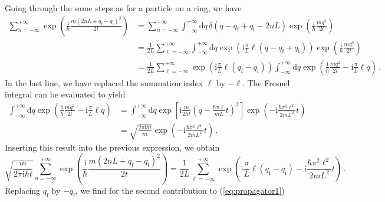 \documentclass[11pt,DIV=19,parskip=half]{scrartcl}
\begin{document}
Going through the same steps as for a particle on a ring, we have
\begin{equation}
 \begin{aligned}
  \sum_{n=-\infty}^{+\infty}\exp\!\left(\frac{\text{i}}{\hbar}
                 \frac{m(2nL+q_\text{f}-q_\text{i})^2}{2t}\right) &= 
  \sum_{n=-\infty}^{+\infty}\int_{-\infty}^{+\infty}\text{d}q\,\delta(q-q_\text{f}+q_\text{i}-2nL)
        \exp\!\left(\frac{\text{i}}{\hbar}\frac{mq^2}{2t}\right)\\
  &= \frac{1}{2L}\sum_{\ell=-\infty}^{+\infty}\int_{-\infty}^{+\infty}\text{d}q
       \exp\!\left(\text{i}\frac{\pi}{L}\ell(q-q_\text{f}+q_\text{i})\right)
       \exp\!\left(\frac{\text{i}}{\hbar}\frac{mq^2}{2t}\right)\\
  &= \frac{1}{2L}\sum_{\ell=-\infty}^{+\infty}
         \exp\!\left(\text{i}\frac{\pi}{L}\ell(q_\text{f}-q_\text{i})\right)
  \int_{-\infty}^{+\infty}\text{d}q\exp\!\left(\frac{\text{i}}{\hbar}\frac{mq^2}{2t}
                         -\text{i}\frac{\pi}{L}\ell q\right)\,.
 \end{aligned}
\end{equation}
In the last line, we have replaced the summation index $\ell$ by $-\ell$. The Fresnel integral
can be evaluated to yield
\begin{equation}
 \begin{aligned}
  \int_{-\infty}^{+\infty}\text{d}q\exp\!\left(\frac{\text{i}}{\hbar}\frac{mq^2}{2t}
          -\text{i}\frac{\pi}{L}\ell q\right) &=
  \int_{-\infty}^{+\infty}\text{d}q\exp\!\left[\text{i}\frac{m}{2\hbar t}\left(q-
            \frac{\hbar\pi\ell}{mL}t\right)^2\right]
        \exp\!\left(-\text{i}\frac{\hbar\pi^2\ell^2}{2mL^2}t\right)\\
    &= \sqrt{\frac{2\pi\text{i}\hbar t}{m}}\exp\!\left(-\text{i}\frac{\hbar\pi^2\ell^2}{2mL^2}t\right)\,.
 \end{aligned}
\end{equation}
Inserting this result into the previous expression, we obtain
\begin{equation}
 \sqrt{\frac{m}{2\pi\text{i}\hbar t}} \sum_{n=-\infty}^{+\infty}\exp\!\left(\frac{\text{i}}{\hbar}
                 \frac{m(2nL+q_\text{f}-q_\text{i})^2}{2t}\right) = 
 \frac{1}{2L}\sum_{\ell=-\infty}^{+\infty}
    \exp\!\left(\text{i}\frac{\pi}{L}\ell(q_\text{f}-q_\text{i})
       -\text{i}\frac{\hbar\pi^2\ell^2}{2mL^2}t\right)\,.
\end{equation}
Replacing $q_\text{f}$ by $-q_\text{f}$, we find for the second contribution to (\ref{eq:propagator1})
\end{document}
